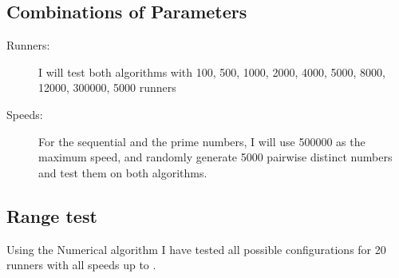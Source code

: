 \subsection{Combinations of Parameters} 

\begin{description}
\item[Runners:] I will test both algorithms with 100, 500, 1000, 2000, 4000, 5000, 8000, 12000, 300000, 5000 runners 
\item[Speeds:] For the sequential and the prime numbers, I will use
  500000 as the maximum speed, and randomly generate 5000 pairwise distinct numbers and test them on both algorithms.
\end{description}

\subsection{Range test}
Using the Numerical algorithm I have tested all possible configurations for 20 runners with all speeds up to \maxNumbers.
